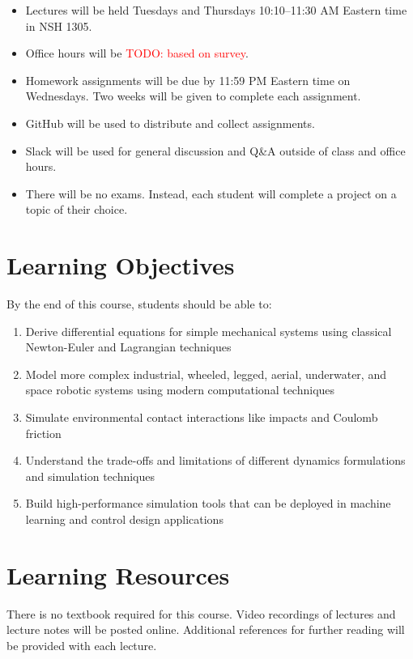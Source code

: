\documentclass[11pt,letterpaper]{article}
\newcommand{\todo}[1]{\textcolor{red}{TODO: #1}}
\begin{document}
\begin{itemize}
	\item Lectures will be held Tuesdays and Thursdays 10:10--11:30 AM Eastern time in NSH 1305.
	\item Office hours will be \todo{based on survey}.
	\item Homework assignments will be due by 11:59 PM Eastern time on Wednesdays. Two weeks will be given to complete each assignment.
	\item GitHub will be used to distribute and collect assignments.
	\item Slack will be used for general discussion and Q\&A outside of class and office hours.
	\item There will be no exams. Instead, each student will complete a project on a topic of their choice.
\end{itemize}

\section*{Learning Objectives}
By the end of this course, students should be able to:
\begin{enumerate}
	\item Derive differential equations for simple mechanical systems using classical Newton-Euler and Lagrangian techniques
	\item Model more complex industrial, wheeled, legged, aerial, underwater, and space robotic systems using modern computational techniques
	\item Simulate environmental contact interactions like impacts and Coulomb friction
	\item Understand the trade-offs and limitations of different dynamics formulations and simulation techniques
	\item Build high-performance simulation tools that can be deployed in machine learning and control design applications
	
\end{enumerate}

\section*{Learning Resources}

There is no textbook required for this course. Video recordings of lectures and lecture notes will be posted online. Additional references for further reading will be provided with each lecture.
\end{document}
